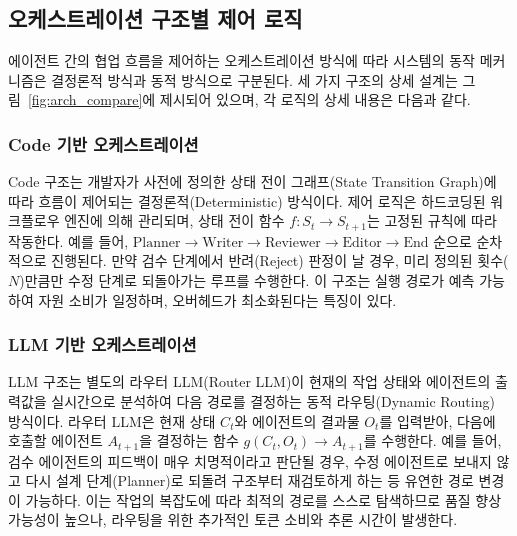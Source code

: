 \documentclass[10pt,twocolumn]{article}
\begin{document}
\subsection{오케스트레이션 구조별 제어 로직}
에이전트 간의 협업 흐름을 제어하는 오케스트레이션 방식에 따라 시스템의 동작 메커니즘은 결정론적 방식과 동적 방식으로 구분된다. 세 가지 구조의 상세 설계는 그림~\ref{fig:arch_compare}에 제시되어 있으며, 각 로직의 상세 내용은 다음과 같다.

\subsubsection{Code 기반 오케스트레이션}
Code 구조는 개발자가 사전에 정의한 상태 전이 그래프(State Transition Graph)에 따라 흐름이 제어되는 결정론적(Deterministic) 방식이다. 제어 로직은 하드코딩된 워크플로우 엔진에 의해 관리되며, 상태 전이 함수 $f: S_t \rightarrow S_{t+1}$는 고정된 규칙에 따라 작동한다. 예를 들어, $\text{Planner} \rightarrow \text{Writer} \rightarrow \text{Reviewer} \rightarrow \text{Editor} \rightarrow \text{End}$ 순으로 순차적으로 진행된다. 만약 검수 단계에서 반려(Reject) 판정이 날 경우, 미리 정의된 횟수($N$)만큼만 수정 단계로 되돌아가는 루프를 수행한다. 이 구조는 실행 경로가 예측 가능하여 자원 소비가 일정하며, 오버헤드가 최소화된다는 특징이 있다.

\subsubsection{LLM 기반 오케스트레이션}
LLM 구조는 별도의 라우터 LLM(Router LLM)이 현재의 작업 상태와 에이전트의 출력값을 실시간으로 분석하여 다음 경로를 결정하는 동적 라우팅(Dynamic Routing) 방식이다. 라우터 LLM은 현재 상태 $C_t$와 에이전트의 결과물 $O_t$를 입력받아, 다음에 호출할 에이전트 $A_{t+1}$을 결정하는 함수 $g(C_t, O_t) \rightarrow A_{t+1}$를 수행한다. 예를 들어, 검수 에이전트의 피드백이 매우 치명적이라고 판단될 경우, 수정 에이전트로 보내지 않고 다시 설계 단계(Planner)로 되돌려 구조부터 재검토하게 하는 등 유연한 경로 변경이 가능하다. 이는 작업의 복잡도에 따라 최적의 경로를 스스로 탐색하므로 품질 향상 가능성이 높으나, 라우팅을 위한 추가적인 토큰 소비와 추론 시간이 발생한다.
\end{document}
